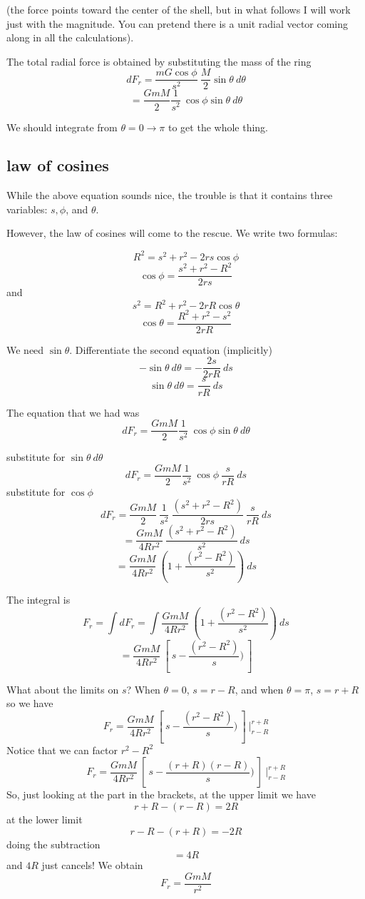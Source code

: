 \documentclass[11pt, oneside]{article}   	%
\begin{document}
(the force points toward the center of the shell, but in what follows I will work just with the magnitude.  You can pretend there is a unit radial vector coming along in all the calculations).

The total radial force is obtained by substituting the mass of the ring
\[ dF_r = \frac{mG \cos \phi}{s^2} \ \frac{M}{2} \sin \theta \ d \theta \]
\[ = \frac{GmM}{2} \frac{1}{s^2} \ \cos \phi \sin \theta \ d \theta \]

We should integrate from $\theta = 0 \rightarrow \pi$ to get the whole thing.

\subsection*{law of cosines}
While the above equation sounds nice, the trouble is that it contains three variables:  $s, \phi$, and $\theta$.  

However, the law of cosines will come to the rescue.  We write two formulas:

\[ R^2 = s^2 + r^2 - 2rs \cos \phi \]
\[ \cos \phi = \frac{s^2 + r^2 - R^2}{2rs} \]
and
\[ s^2 = R^2 + r^2 - 2rR \cos \theta \]
\[ \cos \theta = \frac{R^2 + r^2 - s^2}{2rR} \]

We need $\sin \theta$.  Differentiate the second equation (implicitly)
\[ -\sin \theta \ d \theta = -\frac{2s}{2rR} \ ds  \]
\[ \sin \theta \ d \theta = \frac{s}{rR} \ ds \]

The equation that we had was
\[ dF_r = \frac{GmM}{2} \frac{1}{s^2} \ \cos \phi \sin \theta \ d \theta \]

substitute for $\sin \theta \ d \theta$
\[ dF_r = \frac{GmM}{2} \frac{1}{s^2} \ \cos \phi \ \frac{s}{rR} \ ds \]
substitute for $\cos \phi$
\[ dF_r = \frac{GmM}{2} \ \frac{1}{s^2} \ \frac{(s^2 + r^2 - R^2)}{2rs} \ \frac{s}{rR} \ ds \]
\[ =  \frac{GmM}{4R r^2} \ \frac{(s^2 + r^2 - R^2)}{s^2} \ ds \]
\[ =  \frac{GmM}{4R r^2} \ (1 + \frac{(r^2 - R^2)}{s^2}) \ ds \]

The integral is
\[ F_r = \int dF_r = \int \frac{GmM}{4R r^2} \ (1 + \frac{(r^2 - R^2)}{s^2}) \ ds \]
\[ =  \frac{GmM}{4R r^2} \ [ \ s -  \frac{(r^2 - R^2)}{s}) \ ]  \]

What about the limits on $s$?  When $\theta = 0$, $s = r - R$, and when $\theta = \pi$, $s = r + R$ so we have
\[ F_r = \frac{GmM}{4R r^2} \ [ \ s -  \frac{(r^2 - R^2)}{s}) \ ] \ \bigg |_{r - R}^{r +R} \]
Notice that we can factor $r^2 - R^2$
\[ F_r = \frac{GmM}{4R r^2} \ [ \ s -  \frac{(r+R)(r-R)}{s}) \ ] \ \bigg |_{r - R}^{r +R} \]
So, just looking at the part in the brackets, at the upper limit we have
\[ r + R - (r - R) = 2R \]
at the lower limit
\[ r - R - (r + R) = -2R \]
doing the subtraction 
\[ = 4R \]
and $4R$ just cancels!  We obtain
\[ F_r = \frac{GmM}{r^2} \]
\end{document}

